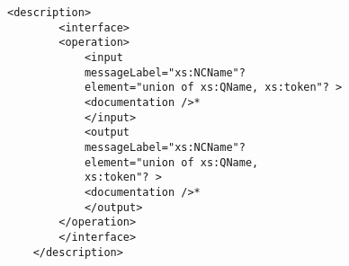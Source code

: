 \begin{figure}[h]
   \begin{Verbatim}[frame=single, fontsize=\small]
	<description>
	    <interface>
		<operation>
		    <input
			messageLabel="xs:NCName"?
			element="union of xs:QName, xs:token"? >
			<documentation />*
		    </input>
		    <output
			messageLabel="xs:NCName"?
			element="union of xs:QName,
			xs:token"? >
			<documentation />*
		    </output>
		</operation>
	    </interface>
	</description>
    \end{Verbatim}

\end{figure}



